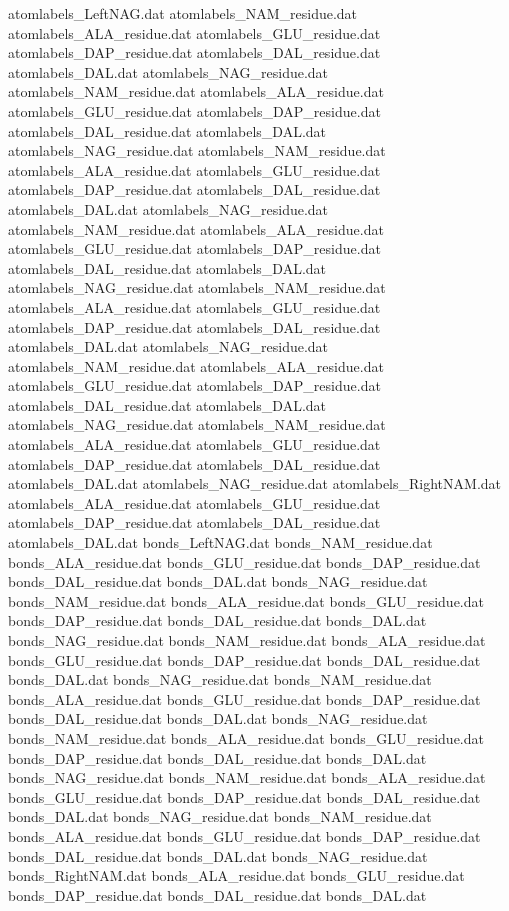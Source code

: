 atomlabels_LeftNAG.dat
atomlabels_NAM_residue.dat
atomlabels_ALA_residue.dat
atomlabels_GLU_residue.dat
atomlabels_DAP_residue.dat
atomlabels_DAL_residue.dat
atomlabels_DAL.dat
atomlabels_NAG_residue.dat
atomlabels_NAM_residue.dat
atomlabels_ALA_residue.dat
atomlabels_GLU_residue.dat
atomlabels_DAP_residue.dat
atomlabels_DAL_residue.dat
atomlabels_DAL.dat
atomlabels_NAG_residue.dat
atomlabels_NAM_residue.dat
atomlabels_ALA_residue.dat
atomlabels_GLU_residue.dat
atomlabels_DAP_residue.dat
atomlabels_DAL_residue.dat
atomlabels_DAL.dat
atomlabels_NAG_residue.dat
atomlabels_NAM_residue.dat
atomlabels_ALA_residue.dat
atomlabels_GLU_residue.dat
atomlabels_DAP_residue.dat
atomlabels_DAL_residue.dat
atomlabels_DAL.dat
atomlabels_NAG_residue.dat
atomlabels_NAM_residue.dat
atomlabels_ALA_residue.dat
atomlabels_GLU_residue.dat
atomlabels_DAP_residue.dat
atomlabels_DAL_residue.dat
atomlabels_DAL.dat
atomlabels_NAG_residue.dat
atomlabels_NAM_residue.dat
atomlabels_ALA_residue.dat
atomlabels_GLU_residue.dat
atomlabels_DAP_residue.dat
atomlabels_DAL_residue.dat
atomlabels_DAL.dat
atomlabels_NAG_residue.dat
atomlabels_NAM_residue.dat
atomlabels_ALA_residue.dat
atomlabels_GLU_residue.dat
atomlabels_DAP_residue.dat
atomlabels_DAL_residue.dat
atomlabels_DAL.dat
atomlabels_NAG_residue.dat
atomlabels_RightNAM.dat
atomlabels_ALA_residue.dat
atomlabels_GLU_residue.dat
atomlabels_DAP_residue.dat
atomlabels_DAL_residue.dat
atomlabels_DAL.dat
bonds_LeftNAG.dat
bonds_NAM_residue.dat
bonds_ALA_residue.dat
bonds_GLU_residue.dat
bonds_DAP_residue.dat
bonds_DAL_residue.dat
bonds_DAL.dat
bonds_NAG_residue.dat
bonds_NAM_residue.dat
bonds_ALA_residue.dat
bonds_GLU_residue.dat
bonds_DAP_residue.dat
bonds_DAL_residue.dat
bonds_DAL.dat
bonds_NAG_residue.dat
bonds_NAM_residue.dat
bonds_ALA_residue.dat
bonds_GLU_residue.dat
bonds_DAP_residue.dat
bonds_DAL_residue.dat
bonds_DAL.dat
bonds_NAG_residue.dat
bonds_NAM_residue.dat
bonds_ALA_residue.dat
bonds_GLU_residue.dat
bonds_DAP_residue.dat
bonds_DAL_residue.dat
bonds_DAL.dat
bonds_NAG_residue.dat
bonds_NAM_residue.dat
bonds_ALA_residue.dat
bonds_GLU_residue.dat
bonds_DAP_residue.dat
bonds_DAL_residue.dat
bonds_DAL.dat
bonds_NAG_residue.dat
bonds_NAM_residue.dat
bonds_ALA_residue.dat
bonds_GLU_residue.dat
bonds_DAP_residue.dat
bonds_DAL_residue.dat
bonds_DAL.dat
bonds_NAG_residue.dat
bonds_NAM_residue.dat
bonds_ALA_residue.dat
bonds_GLU_residue.dat
bonds_DAP_residue.dat
bonds_DAL_residue.dat
bonds_DAL.dat
bonds_NAG_residue.dat
bonds_RightNAM.dat
bonds_ALA_residue.dat
bonds_GLU_residue.dat
bonds_DAP_residue.dat
bonds_DAL_residue.dat
bonds_DAL.dat
